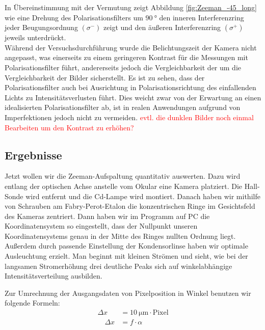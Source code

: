     In Übereinstimmung mit der Vermutung zeigt Abbildung \ref{fig:Zeeman_-45_long} wie eine Drehung des Polarisationsfilters um $\SI{90}{\degree}$ den inneren Interferenzring jeder Beugungsordnung $(\sigma^-)$ zeigt und den äußeren Interferenzring $(\sigma^+)$ jeweils unterdrückt. \\
    
    Während der Versuchsdurchführung wurde die Belichtungszeit der Kamera nicht angepasst, was einerseits zu einem geringeren Kontrast für die Messungen mit Polarisationsfilter führt, andererseits jedoch die Vergleichbarkeit der 
    um die Vergleichbarkeit der Bilder sicherstellt. Es ist zu sehen, dass der Polarisationsfilter auch bei Ausrichtung in Polarisationsrichtung des einfallenden Lichts zu Intensitätsverlusten führt. Dies weicht zwar von der Erwartung an einen idealisierten Polarisationsfilter ab, ist in realen Anwendungen aufgrund von Imperfektionen jedoch nicht zu vermeiden. \textcolor{red}{evtl. die dunklen Bilder noch einmal Bearbeiten um den Kontrast zu erhöhen?} 
    
    

    

    
    
\subsection{Ergebnisse}
  
    
    
    Jetzt wollen wir die Zeeman-Aufspaltung quantitativ auswerten. Dazu wird entlang der optischen Achse anstelle vom Okular eine Kamera platziert. Die Hall-Sonde wird entfernt und die Cd-Lampe wird montiert. Danach haben wir mithilfe von Schrauben am Fabry-Perot-Etalon die konzentrischen Ringe im Gesichtsfeld des Kameras zentriert. Dann haben wir im Programm auf PC die Koordinatensystem so eingestellt, dass der Nullpunkt unseren Koordinatensystems genau in der Mitte des Ringes nullten Ordnung liegt. Außerdem durch passende Einstellung der Kondensorlinse haben wir optimale Ausleuchtung erzielt. Man beginnt mit kleinen Strömen und sieht, wie bei der langsamen Stromerhöhung drei deutliche Peaks sich auf winkelabhängige Intensitätsverteilung ausbilden. 

Zur Umrechnung der Ausgangsdaten von Pixelposition in Winkel benutzen wir folgende Formeln:
\begin{align*}
\Delta x &= \SI{10}{\micro\meter} \cdot \text{Pixel} \\
 \quad \Delta x &= f \cdot \alpha
\end{align*}

